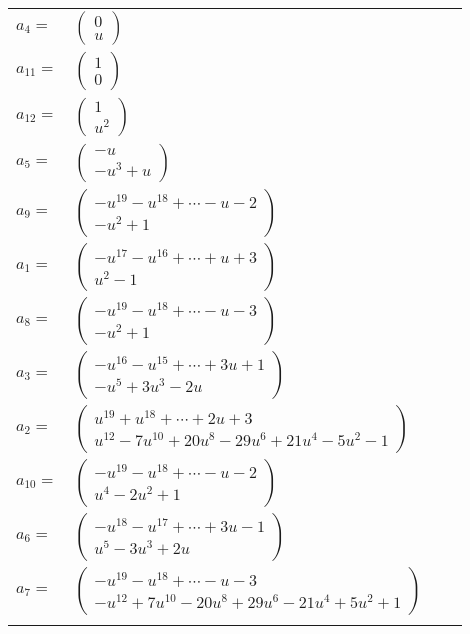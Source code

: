 \documentclass[1p]{elsarticle_modified}
\theoremstyle{definition}
\begin{document}
\begin{tabular}{m{7pt} m{180pt} m{7pt} m{180pt} }
\flushright $a_{4}=$&$\begin{pmatrix}0\\u\end{pmatrix}$ \\
\flushright $a_{11}=$&$\begin{pmatrix}1\\0\end{pmatrix}$ \\
\flushright $a_{12}=$&$\begin{pmatrix}1\\u^2\end{pmatrix}$ \\
\flushright $a_{5}=$&$\begin{pmatrix}- u\\- u^3+u\end{pmatrix}$ \\
\flushright $a_{9}=$&$\begin{pmatrix}- u^{19}- u^{18}+\cdots- u-2\\- u^2+1\end{pmatrix}$ \\
\flushright $a_{1}=$&$\begin{pmatrix}- u^{17}- u^{16}+\cdots+u+3\\u^2-1\end{pmatrix}$ \\
\flushright $a_{8}=$&$\begin{pmatrix}- u^{19}- u^{18}+\cdots- u-3\\- u^2+1\end{pmatrix}$ \\
\flushright $a_{3}=$&$\begin{pmatrix}- u^{16}- u^{15}+\cdots+3 u+1\\- u^5+3 u^3-2 u\end{pmatrix}$ \\
\flushright $a_{2}=$&$\begin{pmatrix}u^{19}+u^{18}+\cdots+2 u+3\\u^{12}-7 u^{10}+20 u^8-29 u^6+21 u^4-5 u^2-1\end{pmatrix}$ \\
\flushright $a_{10}=$&$\begin{pmatrix}- u^{19}- u^{18}+\cdots- u-2\\u^4-2 u^2+1\end{pmatrix}$ \\
\flushright $a_{6}=$&$\begin{pmatrix}- u^{18}- u^{17}+\cdots+3 u-1\\u^5-3 u^3+2 u\end{pmatrix}$ \\
\flushright $a_{7}=$&$\begin{pmatrix}- u^{19}- u^{18}+\cdots- u-3\\- u^{12}+7 u^{10}-20 u^8+29 u^6-21 u^4+5 u^2+1\end{pmatrix}$\\&\end{tabular}
\end{document}

